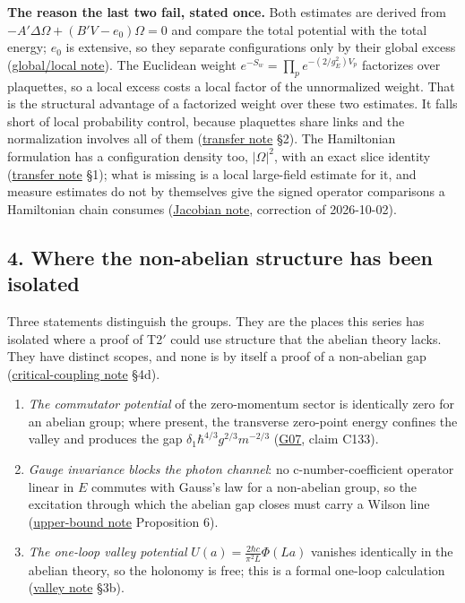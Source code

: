 \documentclass[11pt,a4paper]{article}
\newcommand{\tightlist}{\setlength{\itemsep}{0pt}\setlength{\parskip}{0pt}}
\begin{document}
\textbf{The reason the last two fail, stated once.} Both estimates are
derived from \(-A'\Delta\Omega+(B'V-e_0)\Omega=0\) and compare the total
potential with the total energy; \(e_0\) is extensive, so they separate
configurations only by their global excess
(\href{agmon-ground-state-suppression.md}{global/local note}). The
Euclidean weight \(e^{-S_w}=\prod_pe^{-(2/g_E^2)V_p}\) factorizes over
plaquettes, so a local excess costs a local factor of the unnormalized
weight. That is the structural advantage of a factorized weight over
these two estimates. It falls short of local probability control,
because plaquettes share links and the normalization involves all of
them (\href{ground-state-measure-transfer.md}{transfer note} §2). The
Hamiltonian formulation has a configuration density too, \(|\Omega|^2\),
with an exact slice identity
(\href{ground-state-measure-transfer.md}{transfer note} §1); what is
missing is a local large-field estimate for it, and measure estimates do
not by themselves give the signed operator comparisons a Hamiltonian
chain consumes (\href{flow-jacobian-truncation-error.md}{Jacobian note},
correction of 2026-10-02).

\hypertarget{where-the-non-abelian-structure-has-been-isolated}{%
\subsection{4. Where the non-abelian structure has been
isolated}\label{where-the-non-abelian-structure-has-been-isolated}}

Three statements distinguish the groups. They are the places this series
has isolated where a proof of T2\('\) could use structure that the
abelian theory lacks. They have distinct scopes, and none is by itself a
proof of a non-abelian gap
(\href{mass-gap-obligations-lattice.md}{critical-coupling note} §4d).

\begin{enumerate}
\def\labelenumi{\arabic{enumi}.}
\tightlist
\item
  \emph{The commutator potential} of the zero-momentum sector is
  identically zero for an abelian group; where present, the transverse
  zero-point energy confines the valley and produces the gap
  \(\delta_1\hbar^{4/3}g^{2/3}m^{-2/3}\)
  (\href{low-dimensional-mass-gap.md}{G07}, claim C133).
\item
  \emph{Gauge invariance blocks the photon channel}: no
  c-number-coefficient operator linear in \(E\) commutes with Gauss's
  law for a non-abelian group, so the excitation through which the
  abelian gap closes must carry a Wilson line
  (\href{lattice-gap-upper-bounds.md}{upper-bound note} Proposition 6).
\item
  \emph{The one-loop valley potential}
  \(U(a)=\frac{2\hbar c}{\pi^2L}\Phi(La)\) vanishes identically in the
  abelian theory, so the holonomy is free; this is a formal one-loop
  calculation (\href{torus-valley-potential.md}{valley note} §3b).
\end{enumerate}
\end{document}
